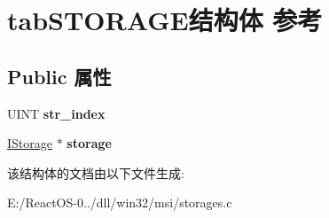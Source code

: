 \hypertarget{structtab_s_t_o_r_a_g_e}{}\section{tab\+S\+T\+O\+R\+A\+G\+E结构体 参考}
\label{structtab_s_t_o_r_a_g_e}
\subsection*{Public 属性}
\begin{DoxyCompactItemize}
\item 
\mbox{\label{structtab_s_t_o_r_a_g_e_a83aee5066310cc9c54936cddc6fac615}} 
U\+I\+NT {\bfseries str\+\_\+index}
\item 
\mbox{\label{structtab_s_t_o_r_a_g_e_aa487b51ef09f3f6d96af40405f8fbc77}} 
\hyperlink{interface_i_storage}{I\+Storage} $\ast$ {\bfseries storage}
\end{DoxyCompactItemize}


该结构体的文档由以下文件生成\+:\begin{DoxyCompactItemize}
\item 
E\+:/\+React\+O\+S-\/0../dll/win32/msi/storages.\+c\end{DoxyCompactItemize}
